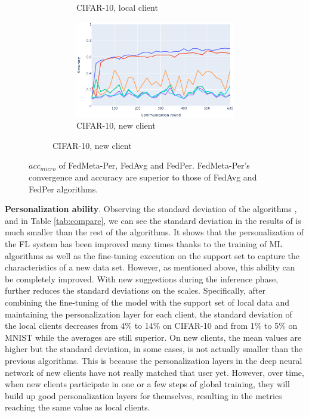 \documentclass[runningheads]{llncs}
\begin{document}
\begin{figure}[h]
\begin{subfigure}{\textwidth}
\begin{subfigure}{.49\textwidth}
            \caption{CIFAR-10, local client}\label{cifar_old_per}
        \end{subfigure}
        \begin{subfigure}{.49\textwidth}
            \includegraphics[width=\linewidth]{img/cifar_new_per.eps}
            \caption{CIFAR-10, new client}\label{cifar_new_per}
        \end{subfigure}
    \end{subfigure}
    \caption{$acc_{micro}$ of FedMeta-Per, FedAvg and FedPer. FedMeta-Per's convergence and accuracy are superior to those of FedAvg and FedPer algorithms.} \label{fig:fedpermeta_vs_chicken}
\end{figure}

\textbf{Personalization ability}. Observing the standard deviation of the algorithms ,  and  in Table \ref{tab:compare}, we can see the standard deviation in the results of  is much smaller than the rest of the algorithms. It shows that the personalization of the FL system has been improved many times thanks to the training of ML algorithms as well as the fine-tuning execution on the support set to capture the characteristics of a new data set. However, as mentioned above, this ability can be completely improved. With new suggestions during the inference phase,  further reduces the standard deviations on the scales. Specifically, after combining the fine-tuning of the model with the support set of local data and maintaining the personalization layer for each client, the standard deviation of the local clients decreases from 4\% to 14\% on CIFAR-10 and from 1\% to 5\% on MNIST while the averages are still superior. On new clients, the mean values are higher but the standard deviation, in some cases, is not actually smaller than the previous algorithms. This is because the personalization layers in the deep neural network of new clients have not really matched that user yet. However, over time, when new clients participate in one or a few steps of global training, they will build up good personalization layers for themselves, resulting in the metrics reaching the same value as local clients.
\end{document}

